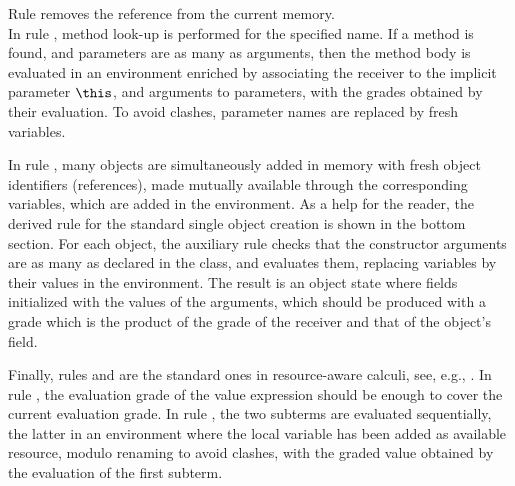 Rule  removes the reference from the current memory.\\
In rule , method look-up is performed for the specified name. If a method is found, and parameters are as many as arguments, then the method body is evaluated in an environment enriched by associating the receiver to the implicit parameter $\this$, and arguments to parameters, with the grades obtained by their evaluation. To avoid clashes, parameter names are replaced by fresh variables. 

\bez
In rule , many objects are simultaneously added in memory with fresh object identifiers (references), made mutually available through the corresponding variables, which are added in the environment. As a help for the reader, the derived rule  for the standard single object creation is shown in the bottom section.
For each object, the auxiliary rule  checks that the constructor arguments are as many as declared in the class, and evaluates them, replacing variables by their values in the environment. The result is an object state where fields initialized with the values of the arguments, which should be produced with a grade which is the product of the grade of the receiver and that of the object's field. \eez

Finally, rules  and  are the standard ones in resource-aware calculi, see, e.g., \cite{BianchiniDGZ23oopsla}. In rule , the evaluation grade of the value expression should be enough to cover the current evaluation grade.
In rule , the two subterms are evaluated sequentially, the latter in an environment where the local variable has been added  as available resource, modulo renaming to avoid clashes, with the graded value obtained by the evaluation of the first subterm.
  
